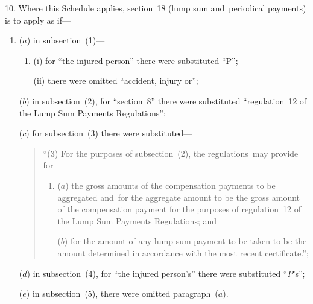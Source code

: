 \documentclass[12pt,a4paper]{article}
\begin{document}
\medskip

10.  Where this Schedule applies, section~18 (lump sum and~periodical payments) is to apply as if—
\begin{enumerate}\item[]
($a$) in subsection~(1)—
\begin{enumerate}\item[]
(i) for “the injured person” there were substituted “P”;

(ii) there were omitted “accident, injury or”;
\end{enumerate}

($b$) in subsection~(2), for “section~8” there were substituted “regulation~12 of the Lump Sum Payments Regulations”;

($c$) for subsection~(3) there were substituted—
\begin{quotation}
“(3) For the purposes of subsection~(2), the regulations~may provide for—
\begin{enumerate}\item[]
($a$) the gross amounts of the compensation payments to be aggregated and~for the aggregate amount to be the gross amount of the compensation payment for the purposes of regulation~12 of the Lump Sum Payments Regulations; and

($b$) for the amount of any lump sum payment to be taken to be the amount determined in accordance with the most recent certificate.”;
\end{enumerate}
\end{quotation}

($d$) in subsection~(4), for “the injured person’s” there were substituted “$P$’s”;

($e$) in subsection~(5), there were omitted paragraph~($a$).
\end{enumerate}

\medskip
\end{document}
